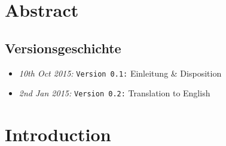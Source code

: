 \documentclass{fhnwreport/fhnwreport}
\begin{document}


\clearpage
\pagestyle{empty}
{
    \section*{Abstract}
    \label{sec:abstract}
    
}


\clearpage
\pagestyle{empty}
{
    \renewcommand{\thispagestyle}[1]{}
    \tableofcontents
    \vspace{35mm}
    \subsection*{Versionsgeschichte}
    \begin{itemize}
        \item[]
            \emph{10th Oct 2015:} \texttt{Version 0.1:} Einleitung \& Disposition
        \item[]
            \emph{2nd Jan 2015:} \texttt{Version 0.2:} Translation to English
    \end{itemize}
}

\clearpage
\setcounter{page}{1}
\pagestyle{headings}

\clearpage
\section{Introduction}
\label{sec:introduction}


%


\clearpage
\end{document}
